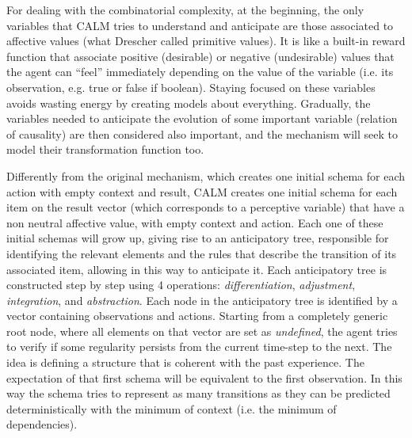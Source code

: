 \documentclass[runningheads]{llncs}
\begin{document}
For dealing with the combinatorial complexity, at the beginning, the only variables that CALM tries to understand and anticipate are those associated to affective values (what Drescher called primitive values).
It is like a built-in reward function that associate positive (desirable) or negative (undesirable) values that the agent can ``feel'' immediately depending on the value of the variable (i.e. its observation, e.g. true or false if boolean).
Staying focused on these variables avoids wasting energy by creating models about everything. 
Gradually, the variables needed to anticipate the evolution of some important variable (relation of causality) are then considered also important, and the mechanism will seek to model their transformation function too.

Differently from the original mechanism, which creates one initial schema for each action with empty context and result, CALM creates one initial schema for each item on the result vector (which corresponds to a perceptive variable) that have a non neutral affective value, with empty context and action.
Each one of these initial schemas will grow up, giving rise to an anticipatory tree, responsible for identifying the relevant elements and the rules that describe the transition of its associated item, allowing in this way to anticipate it. 
Each anticipatory tree is constructed step by step using 4 operations: \textit{differentiation}, \textit{adjustment}, \textit{integration}, and \textit{abstraction}.
Each node in the anticipatory tree is identified by a vector containing observations and actions. 
Starting from a completely generic root node, where all elements on that vector are set as \textit{undefined}, the agent tries to verify if some regularity persists from the current time-step to the next.
The idea is defining a structure that is coherent with the past experience.
The expectation of that first schema will be equivalent to the first observation. 
In this way the schema tries to represent as many transitions as they can be predicted deterministically with the minimum of context (i.e. the minimum of dependencies).
\end{document}
